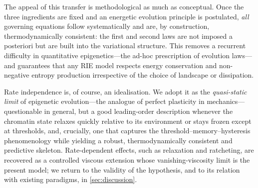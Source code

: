 The appeal of this transfer is methodological as much as conceptual.
Once the three ingredients are fixed and an energetic evolution
principle is postulated, \emph{all} governing equations follow
systematically and are, by construction, thermodynamically consistent:
the first and second laws are not imposed a posteriori but are built
into the variational structure. This removes a recurrent difficulty in
quantitative epigenetics---the ad-hoc prescription of evolution
laws---and guarantees that any RIE model respects energy conservation
and non-negative entropy production irrespective of the choice of
landscape or dissipation.

Rate independence is, of course, an idealisation. We adopt it as the
\emph{quasi-static limit} of epigenetic evolution---the analogue of
perfect plasticity in mechanics---questionable in general, but a good
leading-order description whenever the chromatin state relaxes quickly
relative to its environment or stays frozen except at thresholds, and,
crucially, one that captures the threshold--memory--hysteresis
phenomenology while yielding a robust, thermodynamically consistent and
predictive skeleton. Rate-dependent effects, such as relaxation and
ratcheting, are recovered as a controlled viscous extension whose
vanishing-viscosity limit is the present model; we return to the
validity of the hypothesis, and to its relation with existing
paradigms, in \cref{sec:discussion}.

